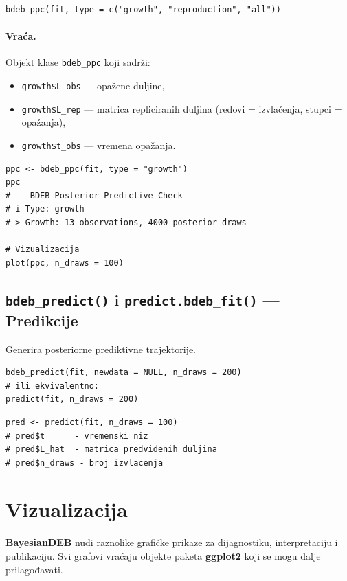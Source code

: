 \documentclass[11pt,a4paper]{article}
\newcommand{\pkg}[1]{\textbf{#1}}
\newcommand{\fn}[1]{\texttt{#1()}}
\newcommand{\code}[1]{\texttt{#1}}
\begin{document}
\begin{lstlisting}
bdeb_ppc(fit, type = c("growth", "reproduction", "all"))
\end{lstlisting}

\paragraph{Vraća.} Objekt klase \code{bdeb\_ppc} koji sadrži:
\begin{itemize}[nosep]
  \item \code{growth\$L\_obs} --- opažene duljine,
  \item \code{growth\$L\_rep} --- matrica repliciranih duljina
    (redovi = izvlačenja, stupci = opažanja),
  \item \code{growth\$t\_obs} --- vremena opažanja.
\end{itemize}

\begin{lstlisting}
ppc <- bdeb_ppc(fit, type = "growth")
ppc
# -- BDEB Posterior Predictive Check ---
# i Type: growth
# > Growth: 13 observations, 4000 posterior draws

# Vizualizacija
plot(ppc, n_draws = 100)
\end{lstlisting}


\subsection{\fn{bdeb\_predict} i \fn{predict.bdeb\_fit} --- Predikcije}

Generira posteriorne prediktivne trajektorije.

\begin{lstlisting}
bdeb_predict(fit, newdata = NULL, n_draws = 200)
# ili ekvivalentno:
predict(fit, n_draws = 200)
\end{lstlisting}

\begin{lstlisting}
pred <- predict(fit, n_draws = 100)
# pred$t      - vremenski niz
# pred$L_hat  - matrica predvidenih duljina
# pred$n_draws - broj izvlacenja
\end{lstlisting}


\section{Vizualizacija}
\label{sec:vizualizacija}

\pkg{BayesianDEB} nudi raznolike grafičke prikaze za dijagnostiku,
interpretaciju i publikaciju.  Svi grafovi vraćaju objekte paketa
\pkg{ggplot2} koji se mogu dalje prilagođavati.
\end{document}
